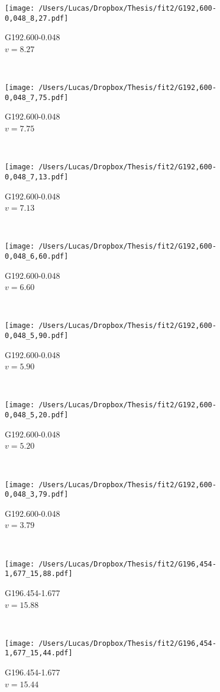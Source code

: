 \begin{figure*}[h]
	\caption[All maser and spot compactness]{}
	\label{fig:allmasers_compact}
	\centering
	\begin{subfigure}[t]{0.3\textwidth}
		\texttt{[image: /Users/Lucas/Dropbox/Thesis/fit2/G192,600-0,048\_8,27.pdf]}
		\caption[]{G192.600-0.048\\$v=8.27$\,\kms}
	\end{subfigure}
	~
	\begin{subfigure}[t]{0.3\textwidth}
		\texttt{[image: /Users/Lucas/Dropbox/Thesis/fit2/G192,600-0,048\_7,75.pdf]}
		\caption[]{G192.600-0.048\\$v=7.75$\,\kms}
	\end{subfigure}
	~
	\begin{subfigure}[t]{0.3\textwidth}
		\texttt{[image: /Users/Lucas/Dropbox/Thesis/fit2/G192,600-0,048\_7,13.pdf]}
		\caption[]{G192.600-0.048\\$v=7.13$\,\kms}
	\end{subfigure}
	~
	\begin{subfigure}[t]{0.3\textwidth}
		\texttt{[image: /Users/Lucas/Dropbox/Thesis/fit2/G192,600-0,048\_6,60.pdf]}
		\caption[]{G192.600-0.048\\$v=6.60$\,\kms}
	\end{subfigure}
	~
	\begin{subfigure}[t]{0.3\textwidth}
		\texttt{[image: /Users/Lucas/Dropbox/Thesis/fit2/G192,600-0,048\_5,90.pdf]}
		\caption[]{G192.600-0.048\\$v=5.90$\,\kms}
	\end{subfigure}
	~
	\begin{subfigure}[t]{0.3\textwidth}
		\texttt{[image: /Users/Lucas/Dropbox/Thesis/fit2/G192,600-0,048\_5,20.pdf]}
		\caption[]{G192.600-0.048\\$v=5.20$\,\kms}
	\end{subfigure}
	~
	\begin{subfigure}[t]{0.3\textwidth}
		\texttt{[image: /Users/Lucas/Dropbox/Thesis/fit2/G192,600-0,048\_3,79.pdf]}
		\caption[]{G192.600-0.048\\$v=3.79$\,\kms}
	\end{subfigure}
	~
	\begin{subfigure}[t]{0.3\textwidth}
		\texttt{[image: /Users/Lucas/Dropbox/Thesis/fit2/G196,454-1,677\_15,88.pdf]}
		\caption[]{G196.454-1.677\\$v=15.88$\,\kms}
	\end{subfigure}
	~
	\begin{subfigure}[t]{0.3\textwidth}
		\texttt{[image: /Users/Lucas/Dropbox/Thesis/fit2/G196,454-1,677\_15,44.pdf]}
		\caption[]{G196.454-1.677\\$v=15.44$\,\kms}
	\end{subfigure}
	~
\end{figure*}
